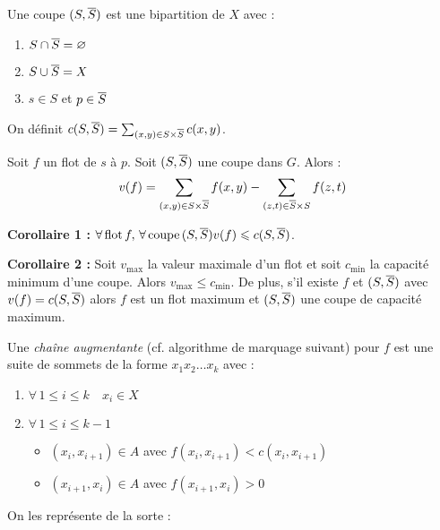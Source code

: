 \documentclass[a4paper, 8pt]{article}
\begin{document}
\begin{multicols*}{3}
Une coupe $(S,\overline{S})$ est une bipartition de $X$ avec :\begin{enumerate}
\item $S \cap \overline{S} = \varnothing$
\item $S \cup \overline{S} = X$
\item $s\in S$ et $p\in \overline{S}$
\end{enumerate}

On définit $c(S,\overline{S}) = \sum_{(x,y)\in S\times\overline{S}}{c(x,y)}$.

Soit $f$ un flot de $s$ à $p$. Soit $(S,\overline{S})$ une coupe dans $G$. Alors :
\[ \displaystyle v(f) = \sum_{(x,y)\in S\times\overline{S}}{f(x,y)} - \sum_{(z,t)\in \overline{S}\times S}{f(z,t)} \]

\textbf{Corollaire 1 :} $\forall\,\text{flot}\,f, \,\forall\,\text{coupe}\,(S,\overline{S})\\v(f) \leqslant c(S,\overline{S})$.

\textbf{Corollaire 2 :} Soit $v_{\text{max}}$ la valeur maximale d'un flot et soit $c_{\text{min}}$ la capacité minimum d'une coupe. Alors $v_{\text{max}} \leqslant c_{\text{min}}$. De plus, s'il existe $f$ et $(S,\overline{S})$ avec $v(f) = c(S,\overline{S})$ alors $f$ est un flot maximum et $(S,\overline{S})$ une coupe de capacité maximum.

Une \textit{chaîne augmentante} (cf. algorithme de marquage suivant) pour $f$ est une suite de sommets de la forme $x_1x_2\ldots x_k$ avec :
\begin{enumerate}
\item $\forall\, 1 \leqslant i \leqslant k\quad x_i \in X$
\item $\forall\, 1 \leqslant i \leqslant k-1$
	\begin{itemize}
	\item $(x_i,x_{i+1})\in A$ avec $f(x_i,x_{i+1}) < c(x_i,x_{i+1})$
	\item $(x_{i+1},x_i)\in A$ avec $f (x_{i+1},x_i) > 0$
	\end{itemize}
\end{enumerate}

On les représente de la sorte :
\begin{center}
\end{center}
\end{multicols*}
\end{document}
